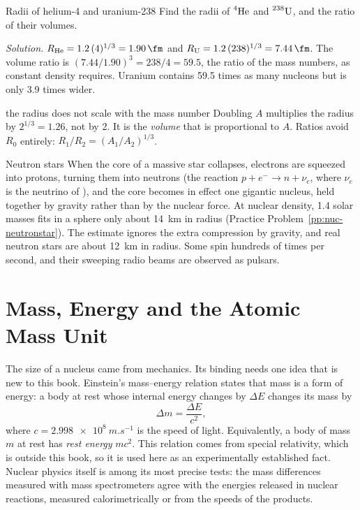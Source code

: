 \begin{exbox}{Radii of helium-4 and uranium-238}\label{ex:nuc-radii}
Find the radii of $\prescript{4}{}{\mathrm{He}}$ and $\prescript{238}{}{\mathrm{U}}$, and the ratio of their volumes.

\emph{Solution.} $R_{\text{He}}=1.2\,(4)^{1/3}=\SI{1.90}{\fm}$ and
$R_{\text{U}}=1.2\,(238)^{1/3}=\SI{7.44}{\fm}$. The volume ratio is
$(7.44/1.90)^3=238/4=59.5$, the ratio of the mass numbers, as constant density requires. Uranium
contains 59.5 times as many nucleons but is only 3.9 times wider.
\end{exbox}

\begin{trapbox}{the radius does not scale with the mass number}
Doubling $A$ multiplies the radius by $2^{1/3}=1.26$, not by 2. It is the \emph{volume} that is
proportional to $A$. Ratios avoid $R_0$ entirely: $R_1/R_2=(A_1/A_2)^{1/3}$.
\end{trapbox}

\begin{remarkbox}{Neutron stars}
When the core of a massive star collapses, electrons are squeezed into protons, turning them into
neutrons (the reaction $p+e^-\to n+\nu_e$, where $\nu_e$ is the neutrino of ), and the
core becomes in effect one gigantic nucleus, held together by gravity rather than by the nuclear
force. At nuclear density, 1.4 solar masses fits in a sphere only about \SI{14}{km} in radius (Practice
Problem~\ref{pp:nuc-neutronstar}). The estimate ignores the extra compression by gravity, and real
neutron stars are about \SI{12}{km} in radius. Some spin hundreds of times per second, and their
sweeping radio beams are observed as pulsars.
\end{remarkbox}

\section{Mass, Energy and the Atomic Mass Unit}\label{sec:nuc-massenergy}

The size of a nucleus came from mechanics. Its binding needs one idea that is new to this book. Einstein's
mass--energy relation states that mass is a form of energy: a body at rest whose internal energy
changes by $\Delta E$ changes its mass by
\[
\Delta m=\frac{\Delta E}{c^2},
\]
where $c=\SI{2.998e8}{m.s^{-1}}$ is the speed of light. Equivalently, a body of mass $m$ at rest has
\emph{rest energy} $mc^2$. This relation comes from special relativity, which is outside this book, so
it is used here as an experimentally established fact. Nuclear physics itself is among its most
precise tests: the mass differences measured with mass spectrometers agree with the energies released
in nuclear reactions, measured calorimetrically or from the speeds of the products.

